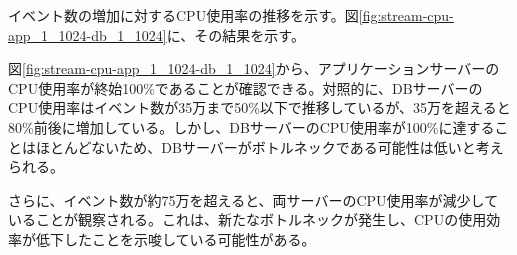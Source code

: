 \documentclass[../../../../../../main]{subfiles}
\begin{document}
    \label{subsubsubsec:result-streaming-only-limit-cpu}

    イベント数の増加に対するCPU使用率の推移を示す。図\ref{fig:stream-cpu-app_1_1024-db_1_1024}に、その結果を示す。

    

    図\ref{fig:stream-cpu-app_1_1024-db_1_1024}から、アプリケーションサーバーのCPU使用率が終始100\%であることが確認できる。対照的に、DBサーバーのCPU使用率はイベント数が35万まで50\%以下で推移しているが、35万を超えると80\%前後に増加している。しかし、DBサーバーのCPU使用率が100\%に達することはほとんどないため、DBサーバーがボトルネックである可能性は低いと考えられる。

    さらに、イベント数が約75万を超えると、両サーバーのCPU使用率が減少していることが観察される。これは、新たなボトルネックが発生し、CPUの使用効率が低下したことを示唆している可能性がある。
\end{document}

